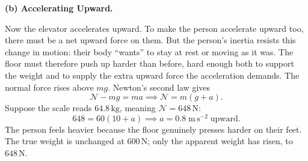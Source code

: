  
\vspace{2.4cm}
\noindent\textbf{\sffamily(b)\; Accelerating Upward.}
 
\noindent
\begin{minipage}[t]{0.55\textwidth}
\vspace{0pt}
Now the elevator accelerates upward. To make the person accelerate upward too, there must
be a net upward force on them. But the person's inertia resists this change in motion: their
body ``wants'' to stay at rest or moving as it was. The floor must therefore push up harder than before, hard enough both to support the weight and to supply the extra upward force the acceleration
demands. The normal force rises above $mg$. Newton's second law gives
\begin{equation}
    \mathscr{N} - mg = ma \implies \mathscr{N} = m(g+a).
\end{equation}
Suppose the scale reads $64.8\,\mathrm{kg}$, meaning $\mathscr{N} = 648\,\mathrm{N}$:
\begin{equation*}
    648 = 60(10+a) \implies a = 0.8\;\mathrm{m\,s^{-2}}\;\text{upward.}
\end{equation*}
The person feels heavier because the floor genuinely presses harder on their feet. The true
weight is unchanged at $600\,\mathrm{N}$; only the apparent weight has risen, to
$648\,\mathrm{N}$.

\end{minipage}%
\hfill
\begin{minipage}[t]{0.6\textwidth}
\vspace{0pt}
\centering
{}
\end{minipage}



